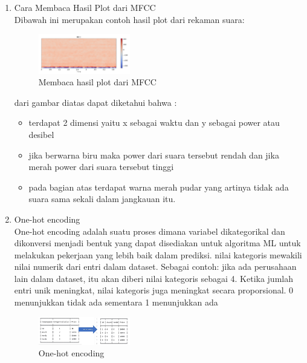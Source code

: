 \begin{enumerate}
\item Cara Membaca Hasil Plot dari MFCC\\
Dibawah ini merupakan contoh hasil plot dari rekaman suara:
\hfill\break
	\begin{figure}[H]
		\includegraphics[width=4cm]{figures/1174054/6/5.png}
		\centering
		\caption{Membaca hasil plot dari MFCC}
	\end{figure}
dari gambar diatas dapat diketahui bahwa :
\begin{itemize}
\item terdapat 2 dimensi yaitu x sebagai waktu dan y sebagai power atau desibel
\item jika berwarna biru maka power dari suara tersebut rendah dan jika merah power dari suara tersebut tinggi
\item pada bagian atas terdapat warna merah pudar yang artinya tidak ada suara sama sekali dalam jangkauan itu.
\end{itemize}

\item One-hot encoding\\
One-hot encoding adalah suatu proses dimana variabel dikategorikal dan dikonversi menjadi bentuk yang dapat disediakan untuk algoritma ML untuk melakukan pekerjaan yang lebih baik dalam prediksi. nilai kategoris mewakili nilai numerik dari entri dalam dataset. Sebagai contoh: jika ada perusahaan lain dalam dataset, itu akan diberi nilai kategoris sebagai 4. Ketika jumlah entri unik meningkat, nilai kategoris juga meningkat secara proporsional. 0 menunjukkan tidak ada sementara 1 menunjukkan ada
\hfill\break
	\begin{figure}[H]
		\includegraphics[width=4cm]{figures/1174054/6/6.png}
		\centering
		\caption{One-hot encoding}
	\end{figure}


\end{enumerate}
